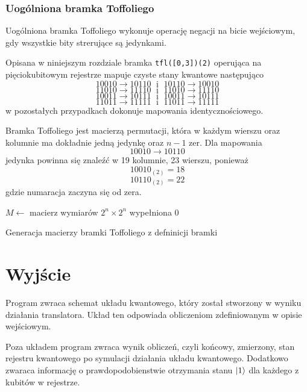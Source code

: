 \subsubsection{Uogólniona bramka Toffoliego}
Uogólniona bramka Toffoliego wykonuje operację negacji na bicie wejściowym, gdy wszystkie bity strerujące są jedynkami.
\par Opisana w niniejszym rozdziale bramka \texttt{tfl([0,3])(2)} operująca na pięciokubitowym rejestrze mapuje czyste stany kwantowe następująco
\[10010  \rightarrow 10110\;\text{ i }\;10110  \rightarrow 10010\] %
\[11010  \rightarrow 11110\;\text{ i }\;11010  \rightarrow 11110\] %
\[10011  \rightarrow 10111\;\text{ i }\;10011  \rightarrow 10111\] %
\[11011  \rightarrow 11111\;\text{ i }\;11011  \rightarrow 11111\] %
w pozostałych przypadkach dokonuje mapowania identycznościowego.
\par Bramka Toffoliego jest macierzą permutacji, która w każdym wierszu oraz kolumnie ma dokładnie jedną jedynkę oraz $n-1$ zer. Dla mapowania
\[10010  \rightarrow 10110\]
jedynka powinna się znaleźć w 19 kolumnie, 23 wierszu, ponieważ 
\[10010_{(2)} = 18\]
\[10110_{(2)} = 22\]
gdzie numaracja zaczyna się od zera.\vspace{4mm}\\
\begin{pseudokod}[H]
    $M \leftarrow$ macierz wymiarów $2^n \times 2^n$ wypełniona 0\;
    \caption{Generacja macierzy bramki Toffoliego z defninicji bramki}\label{alg:toffoliGateGen}
\end{pseudokod}
\section{Wyjście}
Program zwraca schemat układu kwantowego, który został stworzony w wyniku działania translatora. Układ ten odpowiada obliczeniom zdefiniowanym w opisie wejściowym.
\par Poza układem program zwraca wynik obliczeń, czyli końcowy, zmierzony, stan rejestru kwantowego po symulacji działania układu kwantowego. Dodatkowo zwaraca informację o prawdopodobienstwie otrzymania stanu $\ket{1}$ dla każdego z kubitów w rejestrze.